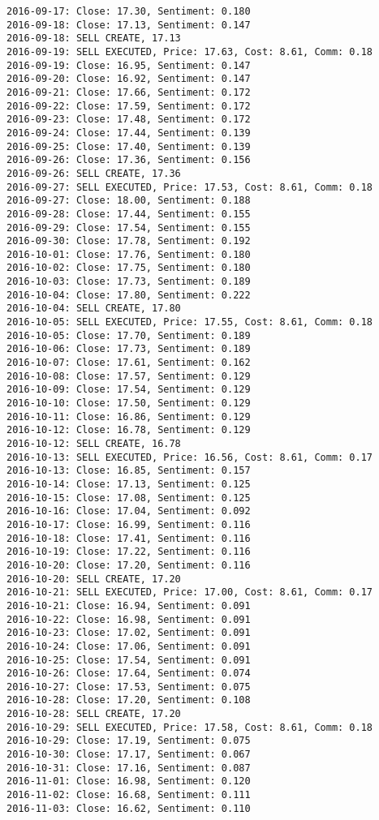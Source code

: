 \documentclass[11pt]{article}
\begin{document}
\begin{Verbatim}[commandchars=\\\{\}]
2016-09-17: Close: 17.30, Sentiment: 0.180
2016-09-18: Close: 17.13, Sentiment: 0.147
2016-09-18: SELL CREATE, 17.13
2016-09-19: SELL EXECUTED, Price: 17.63, Cost: 8.61, Comm: 0.18
2016-09-19: Close: 16.95, Sentiment: 0.147
2016-09-20: Close: 16.92, Sentiment: 0.147
2016-09-21: Close: 17.66, Sentiment: 0.172
2016-09-22: Close: 17.59, Sentiment: 0.172
2016-09-23: Close: 17.48, Sentiment: 0.172
2016-09-24: Close: 17.44, Sentiment: 0.139
2016-09-25: Close: 17.40, Sentiment: 0.139
2016-09-26: Close: 17.36, Sentiment: 0.156
2016-09-26: SELL CREATE, 17.36
2016-09-27: SELL EXECUTED, Price: 17.53, Cost: 8.61, Comm: 0.18
2016-09-27: Close: 18.00, Sentiment: 0.188
2016-09-28: Close: 17.44, Sentiment: 0.155
2016-09-29: Close: 17.54, Sentiment: 0.155
2016-09-30: Close: 17.78, Sentiment: 0.192
2016-10-01: Close: 17.76, Sentiment: 0.180
2016-10-02: Close: 17.75, Sentiment: 0.180
2016-10-03: Close: 17.73, Sentiment: 0.189
2016-10-04: Close: 17.80, Sentiment: 0.222
2016-10-04: SELL CREATE, 17.80
2016-10-05: SELL EXECUTED, Price: 17.55, Cost: 8.61, Comm: 0.18
2016-10-05: Close: 17.70, Sentiment: 0.189
2016-10-06: Close: 17.73, Sentiment: 0.189
2016-10-07: Close: 17.61, Sentiment: 0.162
2016-10-08: Close: 17.57, Sentiment: 0.129
2016-10-09: Close: 17.54, Sentiment: 0.129
2016-10-10: Close: 17.50, Sentiment: 0.129
2016-10-11: Close: 16.86, Sentiment: 0.129
2016-10-12: Close: 16.78, Sentiment: 0.129
2016-10-12: SELL CREATE, 16.78
2016-10-13: SELL EXECUTED, Price: 16.56, Cost: 8.61, Comm: 0.17
2016-10-13: Close: 16.85, Sentiment: 0.157
2016-10-14: Close: 17.13, Sentiment: 0.125
2016-10-15: Close: 17.08, Sentiment: 0.125
2016-10-16: Close: 17.04, Sentiment: 0.092
2016-10-17: Close: 16.99, Sentiment: 0.116
2016-10-18: Close: 17.41, Sentiment: 0.116
2016-10-19: Close: 17.22, Sentiment: 0.116
2016-10-20: Close: 17.20, Sentiment: 0.116
2016-10-20: SELL CREATE, 17.20
2016-10-21: SELL EXECUTED, Price: 17.00, Cost: 8.61, Comm: 0.17
2016-10-21: Close: 16.94, Sentiment: 0.091
2016-10-22: Close: 16.98, Sentiment: 0.091
2016-10-23: Close: 17.02, Sentiment: 0.091
2016-10-24: Close: 17.06, Sentiment: 0.091
2016-10-25: Close: 17.54, Sentiment: 0.091
2016-10-26: Close: 17.64, Sentiment: 0.074
2016-10-27: Close: 17.53, Sentiment: 0.075
2016-10-28: Close: 17.20, Sentiment: 0.108
2016-10-28: SELL CREATE, 17.20
2016-10-29: SELL EXECUTED, Price: 17.58, Cost: 8.61, Comm: 0.18
2016-10-29: Close: 17.19, Sentiment: 0.075
2016-10-30: Close: 17.17, Sentiment: 0.067
2016-10-31: Close: 17.16, Sentiment: 0.087
2016-11-01: Close: 16.98, Sentiment: 0.120
2016-11-02: Close: 16.68, Sentiment: 0.111
2016-11-03: Close: 16.62, Sentiment: 0.110

\end{Verbatim}
\end{document}
